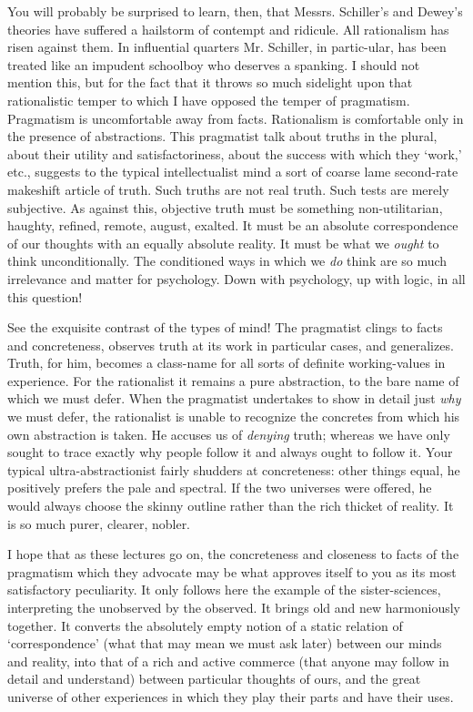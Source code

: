 You will probably be surprised to learn, then, that Messrs. Schiller's
and Dewey's theories have suffered a hailstorm of contempt and
rid\-i\-cule. All rationalism has risen against them. In influential
quarters Mr. Schiller, in partic-ular, has been treated like
an impudent schoolboy who deserves a spanking. I should not mention
this, but for the fact that it throws so much sidelight upon that
rationalistic temper to which I have opposed the temper of pragmatism.
Pragmatism is uncomfortable away from facts. Rationalism is
comfortable only in the presence of abstractions. This pragmatist talk
about truths in the plural, about their utility and satisfactoriness,
about the success with which they `work,' etc., suggests to the
typical intellectualist mind a sort of coarse lame second-rate
makeshift article of truth. Such truths are not real truth. Such tests
are merely subjective. As against this, objective truth must be
something non-utilitarian, haughty, refined, remote, august, exalted.
It must be an absolute correspondence of our thoughts with an equally
absolute reality. It must be what we \textit{ought} to think
unconditionally. The conditioned ways in which we \textit{do} think
are so much irrelevance and matter for psychology. Down with
psychology, up with logic, in all this question!

See the exquisite contrast of the types of mind! The
pragmatist clings to facts and concreteness, observes truth at its
work in particular cases, and generalizes. Truth, for him, becomes a
class-name for all sorts of definite working-values in experience. For
the rationalist it remains a pure abstraction, to the bare name of
which we must defer. When the pragmatist undertakes to show in detail
just \textit{why} we must defer, the rationalist is unable to
recognize the concretes from which his own abstraction is taken. He
accuses us of \textit{denying} truth; whereas we have only sought to
trace exactly why people follow it and always ought to follow it. Your
typical ultra-abstractionist fairly shudders at concreteness: other
things equal, he positively prefers the pale and spectral. If the two
universes were offered, he would always choose the skinny outline
rather than the rich thicket of reality. It is so much purer, clearer,
nobler.

I hope that as these lectures go on, the concreteness and closeness to
facts of the pragmatism which they advocate may be what approves
 itself to you as its most satisfactory peculiarity. It only
follows here the example of the sister-sciences, interpreting the
unobserved by the observed. It brings old and new harmoniously
together. It converts the absolutely empty notion of a static
relation of `correspondence' (what that may mean we must ask later)
between our minds and reality, into that of a rich and active commerce
(that anyone may follow in detail and understand) between particular
thoughts of ours, and the great universe of other experiences in
which they play their parts and have their uses.

